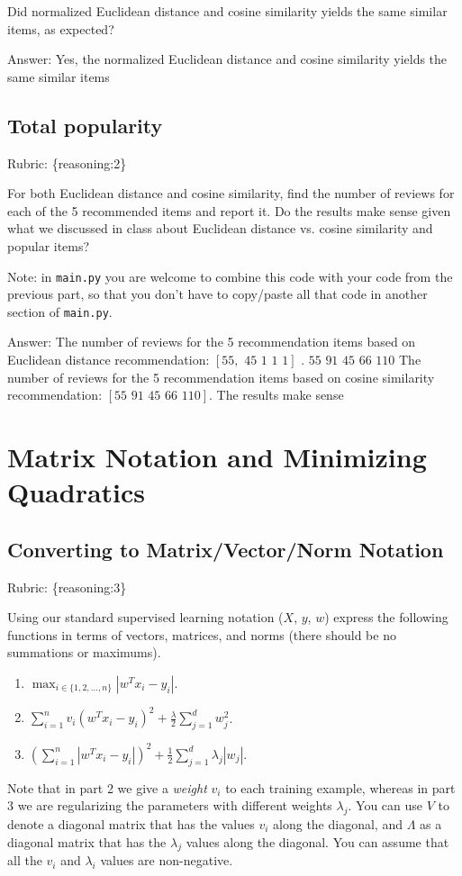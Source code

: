 \documentclass{article}
\def\rubric#1{\gre{Rubric: \{#1\}}}{}
\def\blu#1{{\color{blu}#1}}
\def\gre#1{{\color{gre}#1}}
\def\half{\frac 1 2}
\def\enum#1{\begin{enumerate}#1\end{enumerate}}
\begin{document}
\blu{Did normalized Euclidean distance and cosine similarity yields the same similar items, as expected?}

\gre{Answer:
Yes, the normalized Euclidean distance and cosine similarity yields the same similar items}

\subsection{Total popularity}
\rubric{reasoning:2}

\blu{For both Euclidean distance and cosine similarity, find the number of reviews for each of the 5 recommended items and report it. Do the results make sense given what we discussed in class about Euclidean distance vs. cosine similarity and popular items?}

Note: in \texttt{main.py} you are welcome to combine this code with your code from the previous part, so that you don't have to copy/paste all that code in another section of \texttt{main.py}.

\gre{Answer: The number of reviews for the 5 recommendation items based on Euclidean distance recommendation: $[55,\,\,45\,\,1\,\,1\,\,1]$ . $55\,\, 91\,\,45\,\,66\,\,110$
The number of reviews for the 5 recommendation items based on cosine similarity recommendation: $[55\,\, 91\,\,45\,\,66\,\,110]$.
The results make sense
}


\section{Matrix Notation and Minimizing Quadratics}


\subsection{Converting to Matrix/Vector/Norm Notation}
\rubric{reasoning:3}

Using our standard supervised learning notation ($X$, $y$, $w$)
express the following functions in terms of vectors, matrices, and norms (there should be no summations or maximums).
\blu{\enum{
\item $\max_{i \in \{1,2,\dots,n\}}  |w^Tx_i - y_i|$.
\item $\sum_{i=1}^n v_i(w^Tx_i  - y_i)^2 + \frac{\lambda}{2}\sum_{j=1}^d w_j^2$.
\item $\left(\sum_{i=1}^n |w^Tx_i - y_i|\right)^2 +  \half\sum_{j=1}^{d} \lambda_j|w_j|$.
}}
Note that in part 2 we give a \emph{weight} $v_i$ to each training example, whereas in part 3 we are regularizing the parameters with different weights $\lambda_j$.
You can use $V$ to denote a diagonal matrix that has the values $v_i$ along the diagonal, and $\Lambda$ as a diagonal matrix that has the $\lambda_j$ values along the diagonal. You can assume that all the $v_i$ and $\lambda_i$ values are non-negative.
\end{document}
